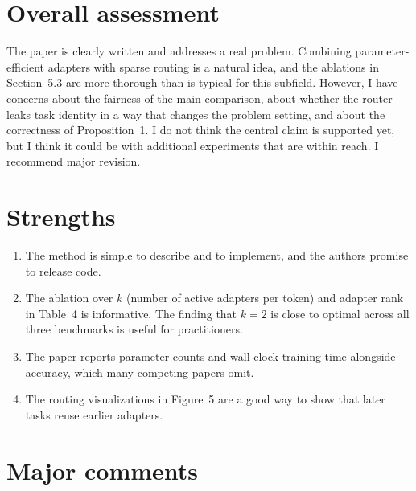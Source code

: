 \documentclass[11pt]{article}
\begin{document}
\section{Overall assessment}

The paper is clearly written and addresses a real problem. Combining parameter-efficient adapters with sparse routing is a natural idea, and the ablations in Section~5.3 are more thorough than is typical for this subfield. However, I have concerns about the fairness of the main comparison, about whether the router leaks task identity in a way that changes the problem setting, and about the correctness of Proposition~1. I do not think the central claim is supported yet, but I think it could be with additional experiments that are within reach. I recommend major revision.

\section{Strengths}

\begin{enumerate}[label=S\arabic*.]
  \item The method is simple to describe and to implement, and the authors promise to release code.
  \item The ablation over $k$ (number of active adapters per token) and adapter rank in Table~4 is informative. The finding that $k = 2$ is close to optimal across all three benchmarks is useful for practitioners.
  \item The paper reports parameter counts and wall-clock training time alongside accuracy, which many competing papers omit.
  \item The routing visualizations in Figure~5 are a good way to show that later tasks reuse earlier adapters.
\end{enumerate}

\section{Major comments}
\end{document}
